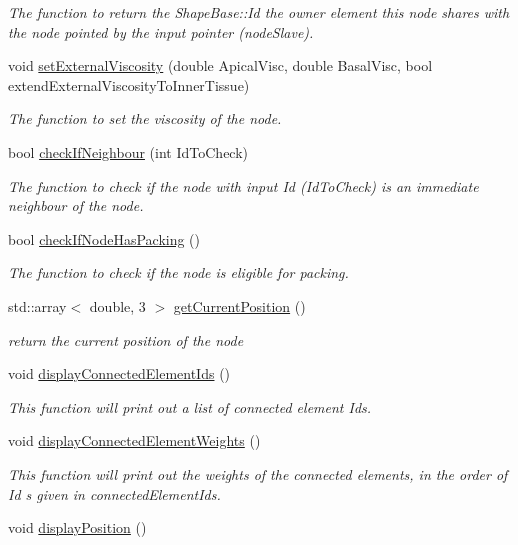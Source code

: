\begin{DoxyCompactItemize}
\begin{DoxyCompactList}\small\item\em The function to return the Shape\+Base\+::\+Id the owner element this node shares with the node pointed by the input pointer (node\+Slave). \end{DoxyCompactList}\item 
void \hyperlink{classNode_adae4720965b558b075a91af4cf742b2a}{set\+External\+Viscosity} (double Apical\+Visc, double Basal\+Visc, bool extend\+External\+Viscosity\+To\+Inner\+Tissue)
\begin{DoxyCompactList}\small\item\em The function to set the viscosity of the node. \end{DoxyCompactList}\item 
bool \hyperlink{classNode_a7dc5a9838a0a1963e58f648c5f7cb635}{check\+If\+Neighbour} (int Id\+To\+Check)
\begin{DoxyCompactList}\small\item\em The function to check if the node with input Id (Id\+To\+Check) is an immediate neighbour of the node. \end{DoxyCompactList}\item 
bool \hyperlink{classNode_a1d80e6f467d8ca919872b6e47a882dd5}{check\+If\+Node\+Has\+Packing} ()
\begin{DoxyCompactList}\small\item\em The function to check if the node is eligible for packing. \end{DoxyCompactList}\item 
std\+::array$<$ double, 3 $>$ \hyperlink{classNode_a7c6a8e48ca7eda39cfb4b83699181cce}{get\+Current\+Position} ()
\begin{DoxyCompactList}\small\item\em return the current position of the node \end{DoxyCompactList}\item 
void \hyperlink{classNode_a3030a518aa97bd50060b8733e87540f7}{display\+Connected\+Element\+Ids} ()
\begin{DoxyCompactList}\small\item\em This function will print out a list of connected element Id\textquotesingle{}s. \end{DoxyCompactList}\item 
void \hyperlink{classNode_a755e8c3d76e7f1f0ab364fc3d4da3a9a}{display\+Connected\+Element\+Weights} ()
\begin{DoxyCompactList}\small\item\em This function will print out the weights of the connected elements, in the order of Id s given in connected\+Element\+Ids. \end{DoxyCompactList}\item 
\hypertarget{classNode_a39d2419d4de14f0d0ecffc7c7809e705}{}void \hyperlink{classNode_a39d2419d4de14f0d0ecffc7c7809e705}{display\+Position} ()\label{classNode_a39d2419d4de14f0d0ecffc7c7809e705}


\end{DoxyCompactItemize}
